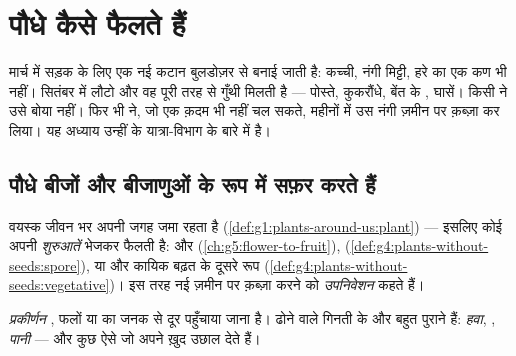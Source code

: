 \chapter{पौधे कैसे फैलते हैं}\label{ch:g6:how-plants-spread}

मार्च में सड़क के लिए एक नई कटान बुलडोज़र से बनाई जाती है: कच्ची, नंगी
मिट्टी, हरे का एक कण भी नहीं। सितंबर में लौटो और वह पूरी तरह  से
गुँथी मिलती है --- पोस्ते, कुकरौंधे, बेंत के , घासें। किसी ने उसे
बोया नहीं। फिर भी  ने, जो एक क़दम भी नहीं चल सकते, महीनों में उस
नंगी ज़मीन पर क़ब्ज़ा कर लिया। यह अध्याय उन्हीं के यात्रा-विभाग के बारे
में है।

\section{पौधे बीजों और बीजाणुओं के रूप में सफ़र करते हैं}

\begin{proposition}[जमे हुए पौधे, सफ़र करती शुरुआतें]\label{prop:g6:how-plants-spread:travel}
वयस्क  जीवन भर अपनी जगह जमा रहता है
(\cref{def:g1:plants-around-us:plant}) --- इसलिए कोई  अपनी
\emph{शुरुआतें} भेजकर फैलती है:  और 
(\cref{ch:g5:flower-to-fruit}), 
(\cref{def:g4:plants-without-seeds:spore}), या  और कायिक
बढ़त के दूसरे रूप
(\cref{def:g4:plants-without-seeds:vegetative})। इस तरह नई ज़मीन पर
क़ब्ज़ा करने को \emph{उपनिवेशन} कहते हैं।
\end{proposition}
\admitted

\begin{definition}[प्रकीर्णन]\label{def:g6:how-plants-spread:dispersal}
\emph{प्रकीर्णन} , फलों या  का जनक  से
दूर पहुँचाया जाना है। ढोने वाले गिनती के और बहुत पुराने हैं:
\emph{हवा}, \emph{}, \emph{पानी} --- और कुछ ऐसे  जो अपने 
ख़ुद उछाल देते हैं।
\end{definition}

